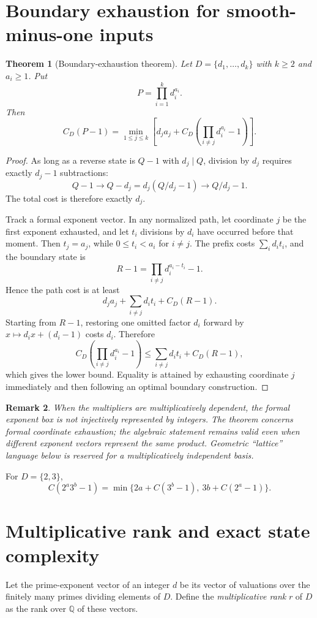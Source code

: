 \documentclass[11pt]{article}
\newtheorem{theorem}{Theorem}[section]
\newtheorem{remark}[theorem]{Remark}
\begin{document}
\section{Boundary exhaustion for smooth-minus-one inputs}
\begin{theorem}[Boundary-exhaustion theorem]\label{thm:boundary}
Let $D=\{d_1,\dots,d_k\}$ with $k\ge2$ and $a_i\ge1$. Put
\[
 P=\prod_{i=1}^k d_i^{a_i}.
\]
Then
\[
 \boxed{
 C_D(P-1)=\min_{1\le j\le k}\left[d_j a_j+C_D\!\left(\prod_{i\ne j}d_i^{a_i}-1\right)\right].}
\]
\end{theorem}
\begin{proof}
As long as a reverse state is $Q-1$ with $d_j\mid Q$, division by $d_j$ requires exactly $d_j-1$ subtractions:
\[
 Q-1\longrightarrow Q-d_j=d_j(Q/d_j-1)\longrightarrow Q/d_j-1.
\]
The total cost is therefore exactly $d_j$.

Track a formal exponent vector. In any normalized path, let coordinate $j$ be the first exponent exhausted, and let $t_i$ divisions by $d_i$ have occurred before that moment. Then $t_j=a_j$, while $0\le t_i<a_i$ for $i\ne j$. The prefix costs $\sum_i d_it_i$, and the boundary state is
\[
 R-1=\prod_{i\ne j}d_i^{a_i-t_i}-1.
\]
Hence the path cost is at least
\[
 d_ja_j+\sum_{i\ne j}d_it_i+C_D(R-1).
\]
Starting from $R-1$, restoring one omitted factor $d_i$ forward by $x\mapsto d_ix+(d_i-1)$ costs $d_i$. Therefore
\[
 C_D\!\left(\prod_{i\ne j}d_i^{a_i}-1\right)
 \le \sum_{i\ne j}d_it_i+C_D(R-1),
\]
which gives the lower bound. Equality is attained by exhausting coordinate $j$ immediately and then following an optimal boundary construction.
\end{proof}

\begin{remark}
When the multipliers are multiplicatively dependent, the formal exponent box is not injectively represented by integers. The theorem concerns formal coordinate exhaustion; the algebraic statement remains valid even when different exponent vectors represent the same product. Geometric ``lattice'' language below is reserved for a multiplicatively independent basis.
\end{remark}

For $D=\{2,3\}$,
\[
 C(2^a3^b-1)=\min\{2a+C(3^b-1),\ 3b+C(2^a-1)\}.
\]

\section{Multiplicative rank and exact state complexity}
Let the prime-exponent vector of an integer $d$ be its vector of valuations over the finitely many primes dividing elements of $D$. Define the \emph{multiplicative rank} $r$ of $D$ as the rank over $\mathbb Q$ of these vectors.
\end{document}
